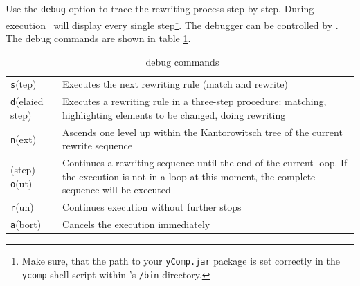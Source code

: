 Use the \texttt{debug} option to trace the rewriting process step-by-step. During execution \yComp\ will display every single step\footnote{Make sure, that the path to your \texttt{yComp.jar} package is set correctly in the \texttt{ycomp} shell script within \GrG's \texttt{/bin} directory.}. The debugger can be controlled by \GrShell. The debug commands are shown in table \ref{tabdebug}.\\
\begin{table}[htbp]
  \begin{tabularx}{\linewidth}{|lX|} \hline
  \texttt{s}(tep) & Executes the next rewriting rule (match and rewrite)\\
  \texttt{d}(elaied step) & Executes a rewriting rule in a three-step procedure: matching, highlighting elements to be changed, doing rewriting \\
  \texttt{n}(ext) & Ascends one level up within the Kantorowitsch tree of the current rewrite sequence\\
  (step) \texttt{o}(ut) & Continues a rewriting sequence until the end of the current loop. If the execution is not in a loop at this moment, the complete sequence will be executed\\
  \texttt{r}(un) &  Continues execution without further stops\\
  \texttt{a}(bort) & Cancels the execution immediately\\ \hline 
  \end{tabularx}
  \caption{\GrShell\ debug commands}
  \label{tabdebug}
\end{table}
